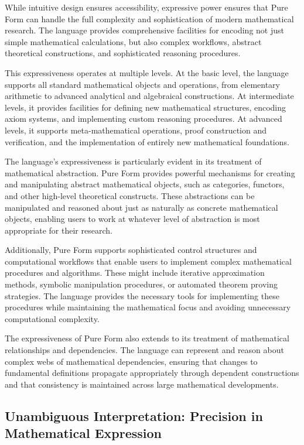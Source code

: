 While intuitive design ensures accessibility, expressive power ensures that Pure Form can handle the full complexity and sophistication of modern mathematical research.
The language provides comprehensive facilities for encoding not just simple mathematical calculations, but also complex workflows, abstract theoretical constructions, and sophisticated reasoning procedures.

This expressiveness operates at multiple levels.
At the basic level, the language supports all standard mathematical objects and operations, from elementary arithmetic to advanced analytical and algebraical constructions.
At intermediate levels, it provides facilities for defining new mathematical structures, encoding axiom systems, and implementing custom reasoning procedures.
At advanced levels, it supports meta-mathematical operations, proof construction and verification, and the implementation of entirely new mathematical foundations.

The language's expressiveness is particularly evident in its treatment of mathematical abstraction.
Pure Form provides powerful mechanisms for creating and manipulating abstract mathematical objects, such as categories, functors, and other high-level theoretical constructs.
These abstractions can be manipulated and reasoned about just as naturally as concrete mathematical objects, enabling users to work at whatever level of abstraction is most appropriate for their research.

Additionally, Pure Form supports sophisticated control structures and computational workflows that enable users to implement complex mathematical procedures and algorithms.
These might include iterative approximation methods, symbolic manipulation procedures, or automated theorem proving strategies.
The language provides the necessary tools for implementing these procedures while maintaining the mathematical focus and avoiding unnecessary computational complexity.

The expressiveness of Pure Form also extends to its treatment of mathematical relationships and dependencies.
The language can represent and reason about complex webs of mathematical dependencies, ensuring that changes to fundamental definitions propagate appropriately through dependent constructions and that consistency is maintained across large mathematical developments.

\subsection{Unambiguous Interpretation: Precision in Mathematical Expression}

